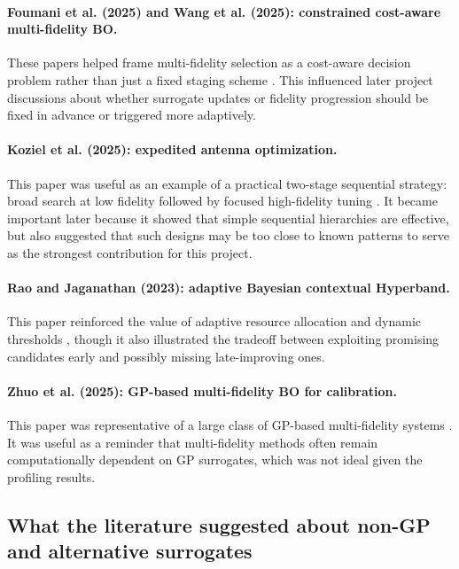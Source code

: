 \documentclass[11pt]{article}
\begin{document}
\paragraph{Foumani et al. (2025) and Wang et al. (2025): constrained cost-aware multi-fidelity BO.}
These papers helped frame multi-fidelity selection as a cost-aware decision problem rather than just a fixed staging scheme \cite{foumani2025cmfbo, wang2025constrained}. This influenced later project discussions about whether surrogate updates or fidelity progression should be fixed in advance or triggered more adaptively.

\paragraph{Koziel et al. (2025): expedited antenna optimization.}
This paper was useful as an example of a practical two-stage sequential strategy: broad search at low fidelity followed by focused high-fidelity tuning \cite{koziel2025antenna}. It became important later because it showed that simple sequential hierarchies are effective, but also suggested that such designs may be too close to known patterns to serve as the strongest contribution for this project.

\paragraph{Rao and Jaganathan (2023): adaptive Bayesian contextual Hyperband.}
This paper reinforced the value of adaptive resource allocation and dynamic thresholds \cite{rao2023bchb}, though it also illustrated the tradeoff between exploiting promising candidates early and possibly missing late-improving ones.

\paragraph{Zhuo et al. (2025): GP-based multi-fidelity BO for calibration.}
This paper was representative of a large class of GP-based multi-fidelity systems \cite{zhuo2025gpmfbo}. It was useful as a reminder that multi-fidelity methods often remain computationally dependent on GP surrogates, which was not ideal given the profiling results.

\subsection{What the literature suggested about non-GP and alternative surrogates}
\end{document}
